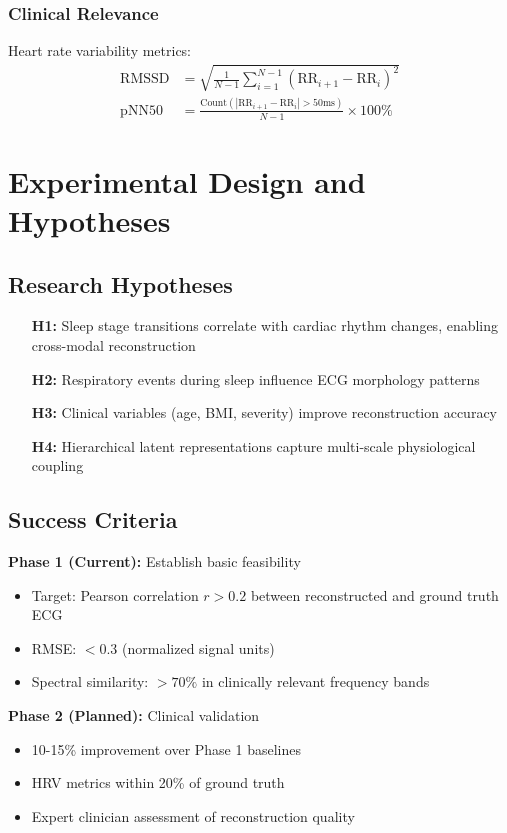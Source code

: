 \documentclass[11pt]{article}
\begin{document}
\subsubsection{Clinical Relevance}
Heart rate variability metrics:
\begin{align}
\text{RMSSD} &= \sqrt{\frac{1}{N-1} \sum_{i=1}^{N-1} (\text{RR}_{i+1} - \text{RR}_i)^2} \\
\text{pNN50} &= \frac{\text{Count}(|\text{RR}_{i+1} - \text{RR}_i| > 50\text{ms})}{N-1} \times 100\%
\end{align}

\section{Experimental Design and Hypotheses}

\subsection{Research Hypotheses}

\begin{enumerate}
\item[\textbf{H1:}] Sleep stage transitions correlate with cardiac rhythm changes, enabling cross-modal reconstruction
\item[\textbf{H2:}] Respiratory events during sleep influence ECG morphology patterns
\item[\textbf{H3:}] Clinical variables (age, BMI, severity) improve reconstruction accuracy
\item[\textbf{H4:}] Hierarchical latent representations capture multi-scale physiological coupling
\end{enumerate}

\subsection{Success Criteria}

\textbf{Phase 1 (Current):} Establish basic feasibility
\begin{itemize}
\item Target: Pearson correlation $r > 0.2$ between reconstructed and ground truth ECG
\item RMSE: $< 0.3$ (normalized signal units)
\item Spectral similarity: $> 70\%$ in clinically relevant frequency bands
\end{itemize}

\textbf{Phase 2 (Planned):} Clinical validation
\begin{itemize}
\item 10-15\% improvement over Phase 1 baselines
\item HRV metrics within 20\% of ground truth
\item Expert clinician assessment of reconstruction quality
\end{itemize}
\end{document}
